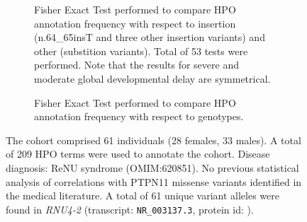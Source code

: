\begin{figure}[htbp]
\centering
\begin{subfigure}[b]{0.95\textwidth}
\centering
{}
\captionsetup{justification=raggedright,singlelinecheck=false}
\caption{Fisher Exact Test performed to compare HPO annotation frequency with respect to insertion (n.64\_65insT and three other insertion variants) and other (substition variants). Total of
        53 tests were performed. Note that the results for severe and moderate global developmental delay are symmetrical.}
\end{subfigure}

\vspace{2em}

\begin{subfigure}[b]{0.95\textwidth}
\centering
{}
\captionsetup{justification=raggedright,singlelinecheck=false}
\caption{Fisher Exact Test performed to compare HPO annotation frequency with respect to genotypes.}
\end{subfigure}

\vspace{2em}

\caption{ The cohort comprised 61 individuals (28 females, 33 males). A total of 209 HPO terms were used to annotate the cohort. Disease diagnosis: ReNU syndrome (OMIM:620851). No previous statistical analysis of correlations with PTPN11 missense variants identified in the medical literature. A total of 61 unique variant alleles were found in \textit{RNU4-2} (transcript: \texttt{NR\_003137.3}, protein id: \texttt{}).}
\end{figure}
